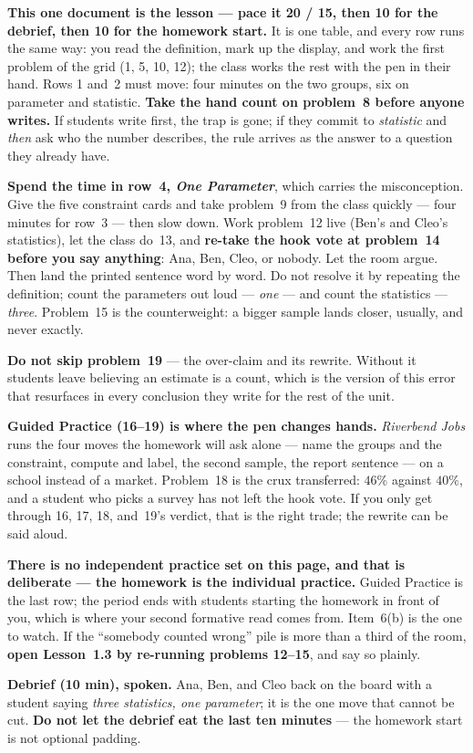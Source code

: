 \documentclass[10pt]{article}
\begin{document}
\begin{teachernote}
\textbf{This one document is the lesson --- pace it 20 / 15, then 10 for the debrief, then 10 for
the homework start.} It is one table, and every row runs the same way: you read the
definition, mark up the display, and work the first problem of the grid (1, 5, 10, 12); the
class works the rest with the pen in their hand. Rows 1 and~2 must move: four minutes on the
two groups, six on parameter and statistic. \textbf{Take the hand count on problem~8 before
anyone writes.} If students write first, the trap is gone; if they commit to \emph{statistic}
and \emph{then} ask who the number describes, the rule arrives as the answer to a question they
already have.

\textbf{Spend the time in row~4, \emph{One Parameter}}, which carries the misconception. Give
the five constraint cards and take problem~9 from the class quickly --- four minutes for row~3
--- then slow down. Work problem~12 live (Ben's and Cleo's statistics), let the class do~13,
and \textbf{re-take the hook vote at problem~14 before you say anything}: Ana, Ben, Cleo, or
nobody. Let the room argue. Then land the printed sentence word by word. Do not resolve it by
repeating the definition; count the parameters out loud --- \emph{one} --- and count the
statistics --- \emph{three}. Problem~15 is the counterweight: a bigger sample lands closer,
usually, and never exactly.

\textbf{Do not skip problem~19} --- the over-claim and its rewrite. Without it students leave
believing an estimate is a count, which is the version of this error that resurfaces in every
conclusion they write for the rest of the unit.

\textbf{Guided Practice (16--19) is where the pen changes hands.} \emph{Riverbend Jobs} runs
the four moves the homework will ask alone --- name the groups and the constraint, compute and
label, the second sample, the report sentence --- on a school instead of a market. Problem~18
is the crux transferred: $46\%$ against $40\%$, and a student who picks a survey has not left
the hook vote. If you only get through 16, 17, 18, and~19's verdict, that is the right trade;
the rewrite can be said aloud.

\textbf{There is no independent practice set on this page, and that is deliberate --- the
homework is the individual practice.} Guided Practice is the last row; the period ends with
students starting the homework in front of you, which is where your second formative read
comes from. Item~6(b) is the one to watch. If the ``somebody counted wrong'' pile is more than
a third of the room, \textbf{open Lesson~1.3 by re-running problems 12--15}, and say so
plainly.

\textbf{Debrief (10 min), spoken.} Ana, Ben, and Cleo back on the board with a student saying
\emph{three statistics, one parameter}; it is the one move that cannot be cut. \textbf{Do not
let the debrief eat the last ten minutes} --- the homework start is not optional padding.
\end{teachernote}
\end{document}
